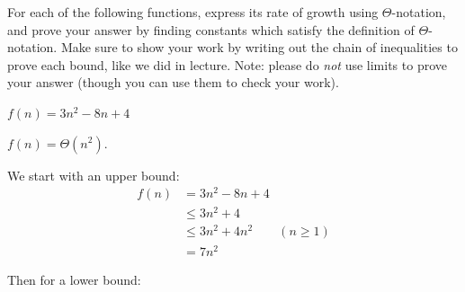 \begin{prob}
    For each of the following functions, express its rate of growth using
    $\Theta$-notation, and prove your answer by finding constants which satisfy
    the definition of $\Theta$-notation. Make sure to show your work by writing
    out the chain of inequalities to prove each bound, like we did in lecture.
    Note: please do \emph{not} use limits to prove your answer (though you can
    use them to check your work).

    \begin{subprobset}
        \begin{subprob}
            $f(n) = 3n^2 - 8n + 4$

            \begin{soln}
                $f(n) = \Theta(n^2)$.

                We start with an upper bound:
                \begin{align*}
                    f(n)
                    &= 3n^2 - 8n + 4 \\
                    &\leq
                        3n^2 + 4
                        \\
                    &\leq
                        3n^2 + 4n^2 \qquad (n \geq 1)
                        \\
                    &= 7n^2
                \end{align*}

                Then for a lower bound:


\end{soln}
\end{subprob}
\end{subprobset}
\end{prob}
